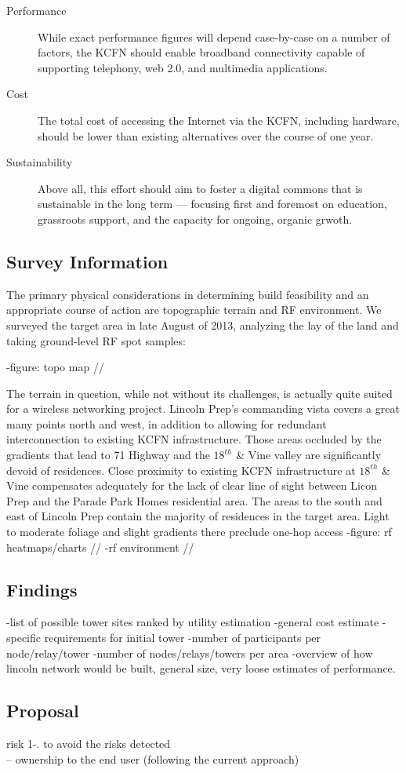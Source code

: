 \begin{description}
\item[Performance] While exact performance figures will depend case-by-case on a
number of factors, the KCFN should enable broadband connectivity capable of supporting
telephony, web 2.0, and multimedia applications.

\item[Cost] The total cost of
accessing the Internet via the KCFN, including hardware, should be lower than existing
alternatives over the course of one year.

\item[Sustainability] Above all, this effort should aim to foster a digital commons 
that is sustainable in the long term --- focusing first and foremost on education, grassroots
support, and the capacity for ongoing, organic grwoth.
\end{description}


\subsection{Survey Information}
The primary physical considerations in determining build feasibility and an
appropriate course of action are topographic terrain and RF environment. We
surveyed the target area in late August of 2013, analyzing the lay of the land
and taking ground-level RF spot samples: \par
-figure: topo map // \par
The terrain in question, while not without its challenges, is actually quite
suited for a wireless networking project. Lincoln Prep's commanding vista covers
a great many points north and west, in addition to allowing for redundant
interconnection to existing KCFN infrastructure.  Those areas occluded by the
gradients that lead to 71 Highway and the $18^{th}$ \& Vine valley are
significantly devoid of residences.  Close proximity to
existing KCFN infrastructure at $18^{th}$ \& Vine compensates adequately for the
lack of clear line of sight  between Licon Prep and the Parade Park Homes
residential area. The areas to the south and east of Lincoln Prep contain the
majority of residences in the target area. Light to moderate foliage and slight
gradients there preclude one-hop access 
-figure: rf heatmaps/charts //
-rf environment //


\subsection{Findings}
-list of possible tower sites ranked by utility estimation
-general cost estimate
-specific requirements for initial tower
-number of participants per node/relay/tower
-number of nodes/relays/towers per area
-overview of how lincoln network would be built, general size, very loose
estimates of performance. 

\subsection{Proposal}

risk 1-. to avoid the risks detected\\
-- ownership to the end user (following the current approach)\\


